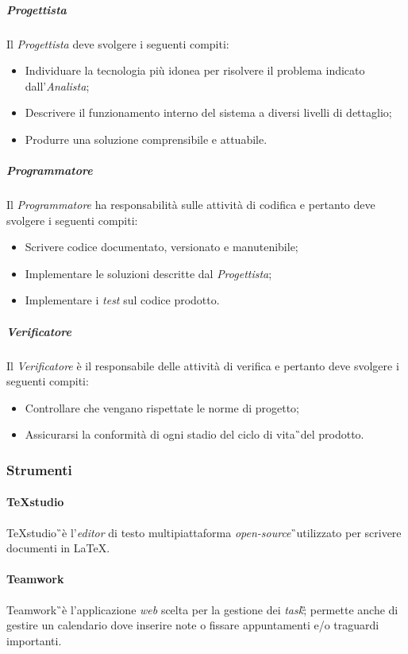 \subparagraph{Progettista} Il \textit{Progettista} deve svolgere i seguenti compiti:
\begin{itemize}
\item Individuare la tecnologia più idonea per risolvere il problema indicato dall'\textit{Analista};
\item Descrivere il funzionamento interno del sistema a diversi livelli di dettaglio;
\item Produrre una soluzione comprensibile e attuabile. 
\end{itemize}

\subparagraph{Programmatore} Il \textit{Programmatore} ha responsabilità sulle attività di codifica e pertanto deve svolgere i seguenti compiti:
\begin{itemize}
\item Scrivere codice documentato, versionato e manutenibile;
\item Implementare le soluzioni descritte dal \textit{Progettista};
\item Implementare i \textit{test} sul codice prodotto. 
\end{itemize}

\subparagraph{Verificatore} Il \textit{Verificatore} è il responsabile delle attività di verifica e pertanto deve svolgere i seguenti compiti:
\begin{itemize}
\item Controllare che vengano rispettate le norme di progetto;
\item Assicurarsi la conformità di ogni stadio del ciclo di vita\G\ del prodotto.
\end{itemize}

\subsubsection{Strumenti}

\paragraph{TeXstudio} TeXstudio\G\ è l'\textit{editor} di testo multipiattaforma \textit{open-source}\G\ utilizzato per scrivere documenti in \LaTeX.
\paragraph{Teamwork} Teamwork\G\ è l'applicazione \textit{web} scelta per la gestione dei \textit{task}\G; permette anche di gestire un calendario dove inserire note o fissare appuntamenti e/o traguardi importanti.

